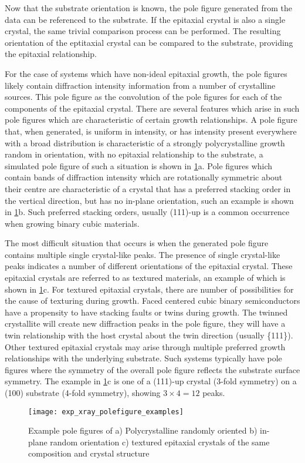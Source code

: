 Now that the substrate orientation is known, the pole figure generated from the data can be referenced to the substrate.
If the epitaxial crystal is also a single crystal, the same trivial comparison process can be performed.
The resulting orientation of the eptitaxial crystal can be compared to the substrate, providing the epitaxial relationship.

For the case of systems which have non-ideal epitaxial growth, the pole figures likely contain diffraction intensity information from a number of crystalline sources.
This pole figure as the convolution of the pole figures for each of the components of the epitaxial crystal.
There are several features which arise in such pole figures which are characteristic of certain growth relationships.
A pole figure that, when generated, is uniform in intensity, or has intensity present everywhere with a broad distribution is characteristic of a strongly polycrystalline growth random in orientation, with no epitaxial relationship to the substrate, a simulated pole figure of such a situation is shown in \cref{fig:exp_xray_polefigure_examples}a.
Pole figures which contain bands of diffraction intensity which are rotationally symmetric about their centre are characteristic of a crystal that has a preferred stacking order in the vertical direction, but has no in-plane orientation, such an example is shown in \cref{fig:exp_xray_polefigure_examples}b.
Such preferred stacking orders, usually (111)-up is a common occurrence when growing binary cubic materials.

The most difficult situation that occurs is when the generated pole figure contains multiple single crystal-like peaks.
The presence of single crystal-like peaks indicates a number of different orientations of the epitaxial crystal.
These epitaxial crystals are referred to as textured materials, an example of which is shown in \cref{fig:exp_xray_polefigure_examples}c.
For textured epitaxial crystals, there are number of possibilities for the cause of texturing during growth.
Faced centered cubic binary semiconductors have a propensity to have stacking faults or twins during growth.
The twinned crystallite will create new diffraction peaks in the pole figure, they will have a twin relationship with the host crystal about the twin direction (usually \{111\}).
Other textured epitaxial crystals may arise through multiple preferred growth relationships with the underlying substrate.
Such systems typically have pole figures where the symmetry of the overall pole figure reflects the substrate surface symmetry.
The example in \cref{fig:exp_xray_polefigure_examples}c is one of a (111)-up crystal (3-fold symmetry) on a (100) substrate (4-fold symmetry), showing \(3\times 4=12\) peaks.
\begin{figure}
 \centering \texttt{[image: exp\_xray\_polefigure\_examples]}
 \caption[Example simulated pole figures]{\label{fig:exp_xray_polefigure_examples}Example pole figures of a) Polycrystalline randomly oriented b) in-plane random orientation c) textured epitaxial crystals of the same composition and crystal structure}
\end{figure}

